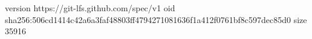version https://git-lfs.github.com/spec/v1
oid sha256:506cd1414c42a6a3faf48803ff4794271081636f1a412f0761bf8c597dec85d0
size 35916
